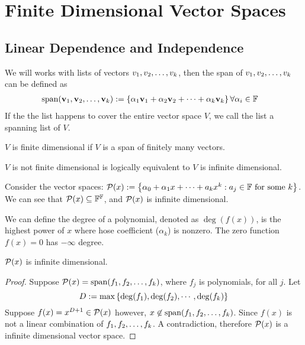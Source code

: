 \section{Finite Dimensional Vector Spaces}
\subsection{Linear Dependence and Independence} 
\begin{definition}
    We will works with lists of vectors ${v}_1,{v}_2, \ldots, {v}_{k}$, then the span of ${v}_1,{v}_2, \ldots, {v}_{k}$ can be defined as
    \begin{align*}
         \text{span} ({\mathbf v}_1,{\mathbf v}_2, \ldots, {\mathbf v}_{k}) &:= \left\{ \alpha_1\mathbf v_1 + \alpha_2 \mathbf v_2 + \cdots  + \alpha_k \mathbf v_k \right\}  \forall \alpha_i \in \mathbb F 
    \end{align*}
    If the the list happens to cover the entire vector space $V$, we call the list a spanning list of $V$.
\end{definition}
\begin{definition}
    $V$ is finite dimensional if $V$ is a span of finitely many vectors.
\end{definition}
\begin{remark}
    $V$ is not finite dimensional is logically equivalent to $V$ is infinite dimensional.
\end{remark}
\begin{example}
    Consider the vector spaces: $\mathcal P(x) : = \left\{ \alpha_0 + \alpha_1 x + \cdots + a_kx^k : a_j \in \mathbb F \text{ for some } k \right\}$. We can see that $\mathcal P(x) \subseteq \mathbb F^{\mathbb F}$, and $\mathcal P(x)$ is infinite dimensional.
\end{example}
\begin{definition}
    We can define the degree of a polynomial, denoted as $\deg(f(x))$, is the highest power of $x$ where hose coefficient ($\alpha_k$) is nonzero. The zero function $f(x) = 0$ has $-\infty$ degree. 
\end{definition} 
\begin{example}
    $\mathcal P(x)$ is infinite dimensional.
\end{example}
\begin{proof}
    Suppose $\mathcal P(x) = \text{span}({f}_1,{f}_2, \ldots, {f}_{k})$, where $f_j$ is polynomials, for all $j$. 
    Let \[D := \text{max}\left\{\deg(f_1), \deg(f_2), \cdots, \deg(f_k)\right\}\] Suppose $f(x) =  x^{D + 1} \in \mathcal P(x)$ however, $x \not\in \text{span}({f}_1,{f}_2, \ldots, {f}_{k})$. Since $f(x)$ is not a linear combination of ${f}_1,{f}_2, \ldots, {f}_{k}$. A contradiction, therefore $\mathcal P(x)$ is a infinite dimensional vector space.
\end{proof}
